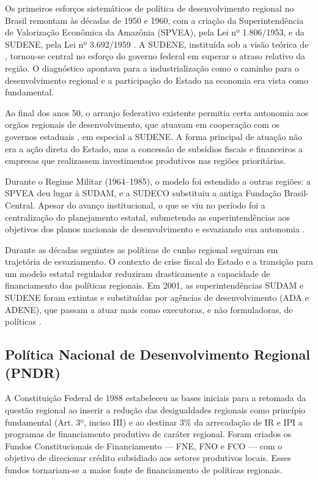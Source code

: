 Os primeiros esforços sistemáticos de política de desenvolvimento regional no Brasil remontam às décadas de 1950 e 1960, com a criação da Superintendência de Valorização Econômica da Amazônia (SPVEA), pela Lei nº 1.806/1953, e da SUDENE, pela Lei nº 3.692/1959 \cite{Silva2014,Portugal2020}. A SUDENE, instituída sob a visão teórica de , tornou-se central no esforço do governo federal em superar o atraso relativo da região. O diagnóstico apontava para a industrialização como o caminho para o desenvolvimento regional e a participação do Estado na economia era vista como fundamental.

Ao final dos anos 50, o arranjo federativo existente permitia certa autonomia aos orgãos regionais de desenvolvimento, que atuavam em cooperação com os governos estaduais \cite{Bercovici2003}, em especial a SUDENE. A forma principal de atuação não era a ação direta do Estado, mas a concessão de subsídios fiscais e financeiros a empresas que realizassem investimentos produtivos nas regiões prioritárias. 

Durante o Regime Militar (1964--1985), o modelo foi estendido a outras regiões: a SPVEA deu lugar à SUDAM, e a SUDECO substituiu a antiga Fundação Brasil-Central. Apesar do avanço institucional, o que se viu no período foi a centralização do planejamento estatal, submetendo as superintendências aos objetivos dos planos nacionais de desenvolvimento e esvaziando sua autonomia \cite{Silva2014}. 

Durante as décadas seguintes as políticas de cunho regional seguiram em trajetória de esvaziamento. O contexto de crise fiscal do Estado e a transição para um modelo estatal regulador reduziram drasticamente a capacidade de financiamento das políticas regionais. Em 2001, as superintendências SUDAM e SUDENE foram extintas e substituídas por agências de desenvolvimento (ADA e ADENE), que passam a atuar mais como executoras, e não formuladoras, de políticas \cite{Portugal2020}.

\subsection{Política Nacional de Desenvolvimento Regional (PNDR)}
\label{subsec:pndr}

A Constituição Federal de 1988 estabeleceu as bases iniciais para a retomada da questão regional ao inserir a redução das desigualdades regionais como princípio fundamental (Art. 3º, inciso III) e ao destinar 3\% da arrecadação de IR e IPI a programas de financiamento produtivo de caráter regional. Foram criados os Fundos Constitucionais de Financiamento --- FNE, FNO e FCO --- com o objetivo de direcionar crédito subsidiado aos setores produtivos locais. Esses fundos tornariam-se a maior fonte de financiamento de políticas regionais.

